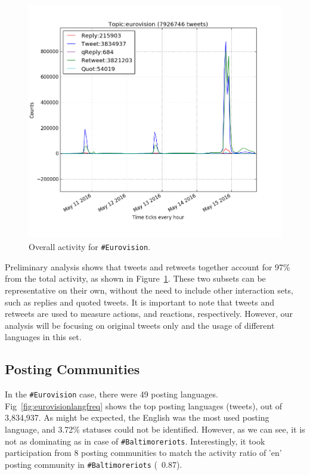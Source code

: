 \begin{figure}[htb]
\centering
\includegraphics[width=\columnwidth]{images/overalleurovisionactivity.png}
\caption{Overall activity for {\texttt{\#Eurovision}}.}
\label{fig:overalleurovisionactivity}
\end{figure}

Preliminary analysis shows that tweets and retweets together account
for 97\% from the total activity, as shown in
Figure~\ref{fig:overalleurovisionactivity}. These two subsets can be
representative on their own, without the need to include other
interaction sets, such as replies and quoted tweets. It is important
to note that tweets and retweets are used to measure actions, and
reactions, respectively. However, our analysis will be focusing on
original tweets only and the usage of different languages in this set.

\subsection{Posting Communities}\label{eurovisionpostingcomm}

In the {\texttt{\#Eurovision}} case, there were 49 posting
languages. Fig~\ref{fig:eurovisionlangfreq} shows the top posting languages
(tweets), out of 3,834,937. As might be expected, the English 
was the most used posting language, and 3.72\% statuses could 
not be identified. However, as we can see, it is not as dominating as in case 
of {\texttt{\#Baltimoreriots}}. Interestingly, it took participation from 8 
posting communities to match the activity ratio of 'en' posting community 
in {\texttt{\#Baltimoreriots}} (~0.87).


